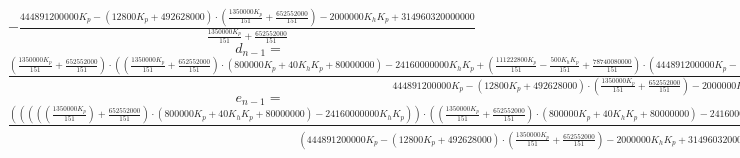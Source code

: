 \documentclass[a4paper,11pt]{article}
\begin{document}
\begin{math}
    -\frac{444891200000 K_p - \left( 12800 K_p + 492628000 \right) \cdot \left( \frac{1350000 K_p}{151} + \frac{652552000}{151} \right) - 2000000 K_h K_p + 314960320000000}{\frac{1350000 K_p}{151} + \frac{652552000}{151}}
\end{math}\\
    $$d_{n-1} =$$
\begin{math}
    \frac{\left( \frac{1350000 K_p}{151} + \frac{652552000}{151} \right) \cdot \left( \left( \frac{1350000 K_p}{151} + \frac{652552000}{151} \right) \cdot \left( 800000 K_p + 40 K_h K_p + 80000000 \right) - 24160000000 K_h K_p + \left( \frac{111222800 K_p}{151} - \frac{500 K_h K_p}{151} + \frac{78740080000}{151} \right) \cdot \left( 444891200000 K_p - \left( 12800 K_p + 492628000 \right) \cdot \left( \frac{1350000 K_p}{151} + \frac{652552000}{151} \right) - 2000000 K_h K_p + 314960320000000 \right) \right) / \left( \frac{1350000 K_p}{151} + \frac{652552000}{151} \right)}{444891200000 K_p - \left( 12800 K_p + 492628000 \right) \cdot \left( \frac{1350000 K_p}{151} + \frac{652552000}{151} \right) - 2000000 K_h K_p + 314960320000000}
\end{math}\\
    $$e_{n-1} =$$
\begin{math}
    \frac{\left( \left( \left( \left( \left( \frac{1350000 K_p}{151} \right) + \frac{652552000}{151} \right) \cdot \left( 800000 K_p + 40 K_h K_p + 80000000 \right) - 24160000000 K_h K_p \right) \right) \cdot \left( \left( \frac{1350000 K_p}{151} + \frac{652552000}{151} \right) \cdot \left( 800000 K_p + 40 K_h K_p + 80000000 \right) - 24160000000 K_h K_p + \left( \frac{111222800 K_p}{151} - \frac{500 K_h K_p}{151} + \frac{78740080000}{151} \right) \cdot \left( 444891200000 K_p - \left( 12800 K_p + 492628000 \right) \cdot \left( \frac{1350000 K_p}{151} + \frac{652552000}{151} \right) - 2000000 K_h K_p + 314960320000000 \right) \right) \right)}{\left( 444891200000 K_p - \left( 12800 K_p + 492628000 \right) \cdot \left( \frac{1350000 K_p}{151} + \frac{652552000}{151} \right) - 2000000 K_h K_p + 314960320000000 \right) + \frac{40000 K_h K_p \cdot \left( 444891200000 K_p - \left( 12800 K_p + 492628000 \right) \cdot \left( \frac{1350000 K_p}{151} + \frac{652552000}{151} \right) - 2000000 K_h K_p + 314960320000000 \right)}{\frac{1350000 K_p}{151} + \frac{652552000}{151}}} {\left( \frac{1350000 K_p}{151} + \frac{652552000}{151} \right) \cdot \left( \left( \frac{1350000 K_p}{151} + \frac{652552000}{151} \right) \cdot \left( 800000 K_p + 40 K_h K_p + 80000000 \right) - 24160000000 K_h K_p + \left( \frac{111222800 K_p}{151} - \frac{500 K_h K_p}{151} + \frac{78740080000}{151} \right) \cdot \left( 444891200000 K_p - \left( 12800 K_p + 492628000 \right) \cdot \left( \frac{1350000 K_p}{151} + \frac{652552000}{151} \right) - 2000000 K_h K_p + 314960320000000 \right) \right)}
\end{math}\\
\end{document}
